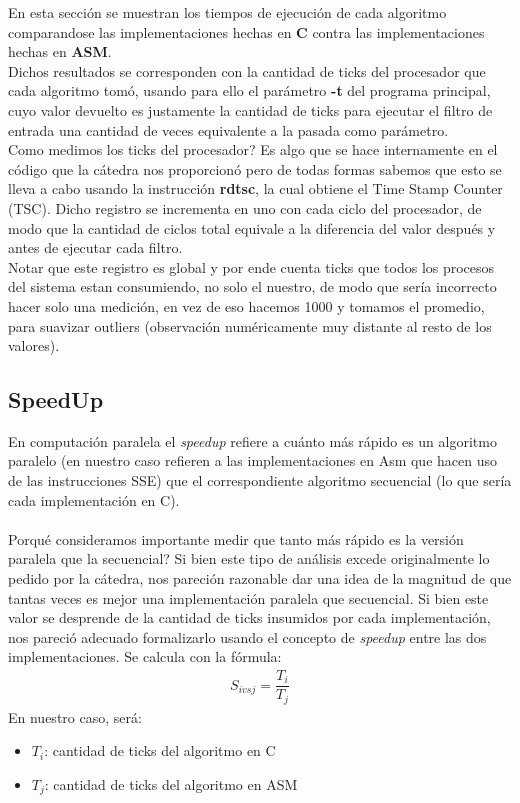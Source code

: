 \indent En esta secci\'on se muestran los tiempos de ejecuci\'on de cada algoritmo comparandose las implementaciones hechas en \textbf{C} contra las implementaciones hechas en \textbf{ASM}.\\
Dichos resultados se corresponden con la cantidad de ticks del procesador que cada algoritmo tom\'o, usando para ello el par\'ametro \textbf{-t} del programa principal, cuyo valor devuelto es justamente la cantidad de ticks para ejecutar el filtro de entrada una cantidad de veces equivalente a la pasada como par\'ametro.\\
\indent Como medimos los ticks del procesador? Es algo que se hace internamente en el c\'odigo que la c\'atedra nos proporcion\'o pero de todas formas sabemos que esto se lleva a cabo usando la instrucci\'on \textbf{rdtsc}, la cual obtiene el Time Stamp Counter (TSC). Dicho registro se incrementa en uno con cada ciclo del procesador, de modo que la cantidad de ciclos total equivale a la diferencia del valor despu\'es y antes de ejecutar cada filtro.\\
Notar que este registro es global y por ende cuenta ticks que todos los procesos del sistema estan consumiendo, no solo el nuestro, de modo que ser\'ia incorrecto hacer solo una medici\'on, en vez de eso hacemos 1000 y tomamos el promedio, para suavizar outliers (observaci\'on num\'ericamente muy distante al resto de los valores).

\subsection{SpeedUp}
\indent En computaci\'on paralela el \textit{speedup} refiere a cu\'anto m\'as r\'apido es un algoritmo paralelo (en nuestro caso refieren a las implementaciones en Asm que hacen uso de las instrucciones SSE) que el correspondiente algoritmo secuencial (lo que ser\'ia cada implementaci\'on en C).\\\\
Porqu\'e consideramos importante medir que tanto m\'as r\'apido es la versi\'on paralela que la secuencial? Si bien este tipo de an\'alisis excede originalmente lo pedido por la c\'atedra, nos pareci\'on razonable dar una idea de la magnitud de que tantas veces es mejor una implementaci\'on paralela que secuencial. Si bien este valor se desprende de la cantidad de ticks insumidos por cada implementaci\'on, nos pareci\'o adecuado formalizarlo usando el concepto de \textit{speedup} entre las dos implementaciones. Se calcula con la f\'ormula:\\
\begin{align}
S_{i vs j} = \dfrac{T_{i}} {T_{j}}
\end{align}
En nuestro caso, será:\\
\begin{itemize}
	\item $T_{i}$: cantidad de ticks del algoritmo en C
	\item $T_{j}$: cantidad de ticks del algoritmo en ASM
\end{itemize}


